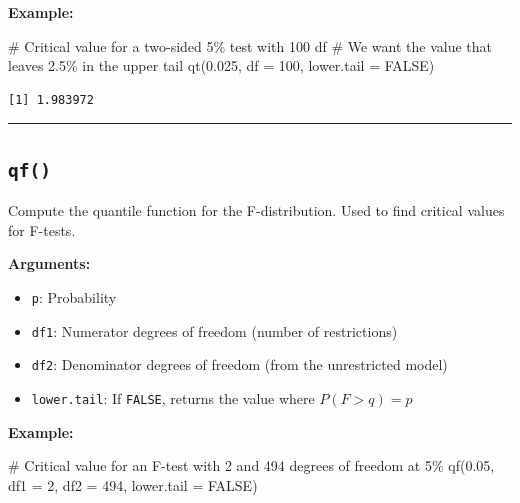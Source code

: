 \documentclass[
  letterpaper,
  DIV=11,
  numbers=noendperiod]{scrreprt}
\newenvironment{Shaded}{\begin{snugshade}}{\end{snugshade}}
\newcommand{\AttributeTok}[1]{\textcolor[rgb]{0.40,0.45,0.13}{#1}}
\newcommand{\CommentTok}[1]{\textcolor[rgb]{0.37,0.37,0.37}{#1}}
\newcommand{\ConstantTok}[1]{\textcolor[rgb]{0.56,0.35,0.01}{#1}}
\newcommand{\DecValTok}[1]{\textcolor[rgb]{0.68,0.00,0.00}{#1}}
\newcommand{\FloatTok}[1]{\textcolor[rgb]{0.68,0.00,0.00}{#1}}
\newcommand{\FunctionTok}[1]{\textcolor[rgb]{0.28,0.35,0.67}{#1}}
\newcommand{\NormalTok}[1]{\textcolor[rgb]{0.00,0.23,0.31}{#1}}
\providecommand{\tightlist}{%
  \setlength{\itemsep}{0pt}\setlength{\parskip}{0pt}}
\begin{document}
\textbf{Example:}

\begin{Shaded}
\begin{Highlighting}[]
\CommentTok{\# Critical value for a two{-}sided 5\% test with 100 df}
\CommentTok{\# We want the value that leaves 2.5\% in the upper tail}
\FunctionTok{qt}\NormalTok{(}\FloatTok{0.025}\NormalTok{, }\AttributeTok{df =} \DecValTok{100}\NormalTok{, }\AttributeTok{lower.tail =} \ConstantTok{FALSE}\NormalTok{)}
\end{Highlighting}
\end{Shaded}

\begin{verbatim}
[1] 1.983972
\end{verbatim}

\begin{center}\rule{0.5\linewidth}{0.5pt}\end{center}

\subsection{\texorpdfstring{\texttt{qf()}}{qf()}}\label{qf}

Compute the quantile function for the F-distribution. Used to find
critical values for F-tests.

\textbf{Arguments:}

\begin{itemize}
\tightlist
\item
  \texttt{p}: Probability
\item
  \texttt{df1}: Numerator degrees of freedom (number of restrictions)
\item
  \texttt{df2}: Denominator degrees of freedom (from the unrestricted
  model)
\item
  \texttt{lower.tail}: If \texttt{FALSE}, returns the value where
  \(P(F > q) = p\)
\end{itemize}

\textbf{Example:}

\begin{Shaded}
\begin{Highlighting}[]
\CommentTok{\# Critical value for an F{-}test with 2 and 494 degrees of freedom at 5\%}
\FunctionTok{qf}\NormalTok{(}\FloatTok{0.05}\NormalTok{, }\AttributeTok{df1 =} \DecValTok{2}\NormalTok{, }\AttributeTok{df2 =} \DecValTok{494}\NormalTok{, }\AttributeTok{lower.tail =} \ConstantTok{FALSE}\NormalTok{)}
\end{Highlighting}
\end{Shaded}
\end{document}
